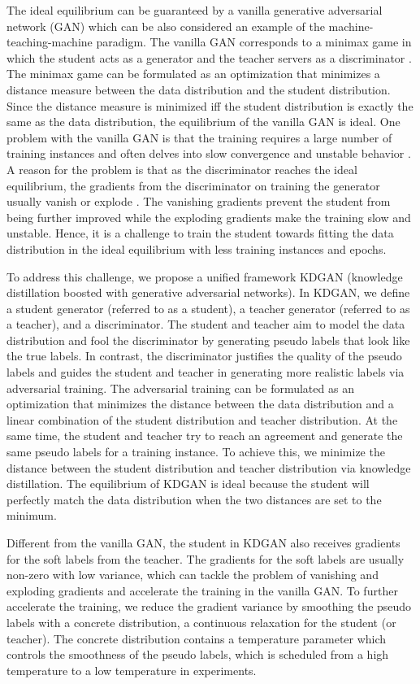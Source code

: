 \documentclass{article}
\begin{document}
The ideal equilibrium can be guaranteed by a vanilla generative adversarial network (GAN) which can be also considered an example of the machine-teaching-machine paradigm.
The vanilla GAN corresponds to a minimax game in which the student acts as a generator and the teacher servers as a discriminator \cite{wang2017irgan}.
The minimax game can be formulated as an optimization that minimizes a distance measure between the data distribution and the student distribution.
Since the distance measure is minimized iff the student distribution is exactly the same as the data distribution, the equilibrium of the vanilla GAN is ideal.
One problem with the vanilla GAN is that the training requires a large number of training instances and often delves into slow convergence and unstable behavior \cite{feizi2017understanding}.
A reason for the problem is that as the discriminator reaches the ideal equilibrium, the gradients from the discriminator on training the generator usually vanish or explode \cite{arjovsky2017towards}.
The vanishing gradients prevent the student from being further improved while the exploding gradients make the training slow and unstable.
Hence, it is a challenge to train the student towards fitting the data distribution in the ideal equilibrium with less training instances and epochs.

To address this challenge, we propose a unified framework KDGAN (knowledge distillation boosted with generative adversarial networks).
In KDGAN, we define a student generator (referred to as a student), a teacher generator (referred to as a teacher), and a discriminator.
The student and teacher aim to model the data distribution and fool the discriminator by generating pseudo labels that look like the true labels.
In contrast, the discriminator justifies the quality of the pseudo labels and guides the student and teacher in generating more realistic labels via adversarial training.
The adversarial training can be formulated as an optimization that minimizes the distance between the data distribution and a linear combination of the student distribution and teacher distribution.
At the same time, the student and teacher try to reach an agreement and generate the same pseudo labels for a training instance.
To achieve this, we minimize the distance between the student distribution and teacher distribution via knowledge distillation.
The equilibrium of KDGAN is ideal because the student will perfectly match the data distribution when the two distances are set to the minimum.

Different from the vanilla GAN, the student in KDGAN also receives gradients for the soft labels from the teacher.
The gradients for the soft labels are usually non-zero with low variance, which can tackle the problem of vanishing and exploding gradients and accelerate the training in the vanilla GAN.
To further accelerate the training, we reduce the gradient variance by smoothing the pseudo labels with a concrete distribution, a continuous relaxation for the student (or teacher).
The concrete distribution contains a temperature parameter which controls the smoothness of the pseudo labels, which is scheduled from a high temperature to a low temperature in experiments.
\end{document}

